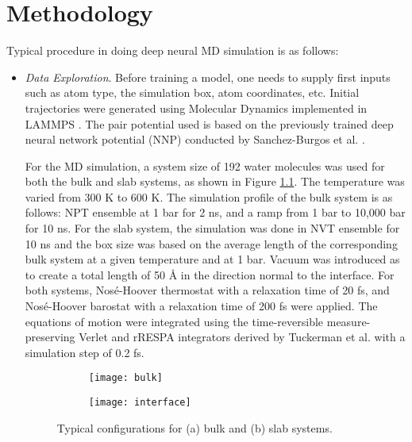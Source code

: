 \chapter{Methodology}
Typical procedure in doing deep neural MD simulation is as follows:

\begin{itemize}
    \item \emph{Data Exploration}. Before training a model, one needs to supply
          first inputs such as	atom type, the simulation box, atom
          coordinates, etc.	 Initial trajectories were generated
          using Molecular Dynamics implemented in
          LAMMPS \cite{LAMMPS}. The pair potential used is based on the
          previously
          trained deep neural network potential (NNP) conducted by
          Sanchez-Burgos et
          al.
          \cite{sanchez2023deep}.

          For the MD simulation, a system size of 192 water molecules was used
          for both
          the bulk and slab systems, as shown in Figure
          \ref{fig:cryst_sctruct}. The
          temperature was varied from 300 K to 600 K. The simulation profile of
          the bulk
          system is as follows: NPT ensemble at 1 bar for 2 ns, and a ramp from
          1 bar to
          10,000 bar for 10 ns. For the slab system, the simulation was done in
          NVT
          ensemble for 10 ns and the box size was based on the average length
          of the
          corresponding bulk system at a given temperature and at 1 bar. Vacuum
          was
          introduced as to create a total length of 50 \r{A} in the direction
          normal to
          the interface. For both systems,
          Nosé-Hoover thermostat  with a
          relaxation time of 20 fs, and  Nosé-Hoover barostat with a relaxation
          time of 200 fs were
          applied. The equations of motion were integrated
          using the time-reversible measure-preserving Verlet and rRESPA
          integrators derived by Tuckerman et al. \cite{Tuckerman2006} with a
          simulation step of 0.2 fs.

          \begin{figure}[tbhp]
              \centering
              \begin{subfigure}{0.42\textwidth}
                  \centering
                  \texttt{[image: bulk]}
                  \caption{}
              \end{subfigure}
              \begin{subfigure}{0.42\textwidth}
                  \centering
                  \texttt{[image: interface]}
                  \caption{}
              \end{subfigure}
              \hfill
              \caption{Typical configurations for (a) bulk and (b) slab
                  systems.}
              \label{fig:cryst_sctruct}
          \end{figure}


\end{itemize}
